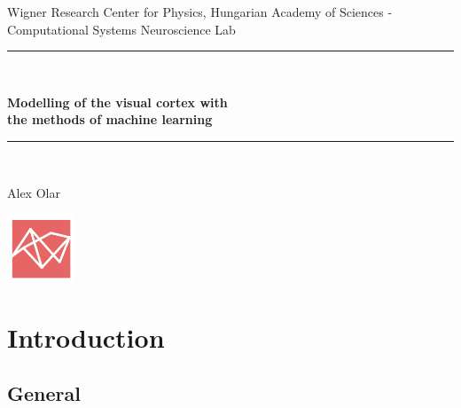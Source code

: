 \documentclass[11pt, english]{article}
\makeatletter
\newcounter{unomenos}
\gdef\@date{ \arabic{unomenos} }
\makeatother
\begin{document}
\begin{titlepage}

\begin{center}
Wigner Research Center for Physics, Hungarian Academy of Sciences - \@date\\
\vspace*{0.15in}
Computational Systems Neuroscience Lab \\
\vspace*{0.4in}
\rule{100mm}{0.1mm}\\
\vspace*{0.3in}
\begin{Large}
\textbf{Modelling of the visual cortex with \\ the methods of machine learning} \\
\end{Large}
\vspace*{0.3in}
\rule{100mm}{0.1mm}\\
\vspace*{0.4in}
\begin{large}
Alex Olar \\
\end{large}
\vfill
\includegraphics[width=2cm]{logoFAC.png}
\end{center}
\end{titlepage}

\newcommand{\CC}{C\nolinebreak\hspace{-.05em}\raisebox{.4ex}{\tiny\bf +}\nolinebreak\hspace{-.10em}\raisebox{.4ex}{\tiny\bf +}}
\def\CC{{C\nolinebreak[4]\hspace{-.05em}\raisebox{.4ex}{\tiny\bf ++}}}

\renewcommand{\thesection}{\Roman{section}.}
\renewcommand{\thesubsection}{\Roman{section}. \arabic{subsection}.}
\renewcommand{\thesubsubsection}{\Roman{section}. \arabic{subsection}.\arabic{subsection}.}

\tableofcontents
\newpage

\section{Introduction}

\subsection{General}
\end{document}
